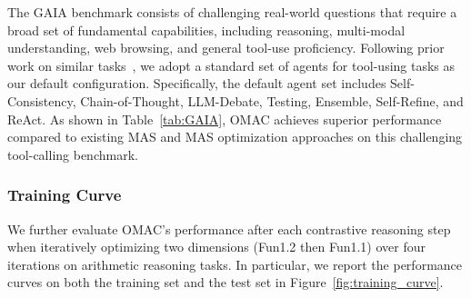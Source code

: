 

The GAIA benchmark consists of challenging real-world questions that require a broad set of fundamental capabilities, including reasoning, multi-modal understanding, web browsing, and general tool-use proficiency. Following prior work on similar tasks~\cite{yao2022react, huang2023agentcoder}, we adopt a standard set of agents for tool-using tasks as our default configuration. Specifically, the default agent set includes Self-Consistency, Chain-of-Thought, LLM-Debate, Testing, Ensemble, Self-Refine, and ReAct. As shown in Table~\ref{tab:GAIA}, OMAC achieves superior performance compared to existing MAS and MAS optimization approaches on this challenging tool-calling benchmark.











\subsubsection{Training Curve}\label{sec:training_curve}


We further evaluate OMAC’s performance after each contrastive reasoning step when iteratively optimizing two dimensions (Fun1.2 then Fun1.1) over four iterations on arithmetic reasoning tasks. In particular, we report the performance curves on both the training set and the test set in Figure~\ref{fig:training_curve}.



